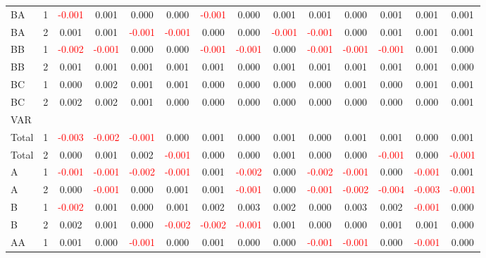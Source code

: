 \begin{table}[H]
{\begin{tabular}{llcccccccccccc}
BA & 1 & \textcolor{red}{-0.001} & 0.001 & 0.000 & 0.000 & \textcolor{red}{-0.001} & 0.000 & 0.001 & 0.001 & 0.000 & 0.001 & 0.001 & 0.001\\
BA & 2 & 0.001 & 0.001 & \textcolor{red}{-0.001} & \textcolor{red}{-0.001} & 0.000 & 0.000 & \textcolor{red}{-0.001} & \textcolor{red}{-0.001} & 0.000 & 0.001 & 0.001 & 0.001\\
BB & 1 & \textcolor{red}{-0.002} & \textcolor{red}{-0.001} & 0.000 & 0.000 & \textcolor{red}{-0.001} & \textcolor{red}{-0.001} & 0.000 & \textcolor{red}{-0.001} & \textcolor{red}{-0.001} & \textcolor{red}{-0.001} & 0.001 & 0.000\\
BB & 2 & 0.001 & 0.001 & 0.001 & 0.001 & 0.001 & 0.000 & 0.001 & 0.001 & 0.001 & 0.001 & 0.001 & 0.000\\
BC & 1 & 0.000 & 0.002 & 0.001 & 0.001 & 0.000 & 0.000 & 0.000 & 0.000 & 0.001 & 0.000 & 0.001 & 0.001\\
BC & 2 & 0.002 & 0.002 & 0.001 & 0.000 & 0.000 & 0.000 & 0.000 & 0.000 & 0.000 & 0.000 & 0.000 & 0.001\\
\hline
VAR &  &  &  &  &  &  &  &  &  &  &  &  & \\
\hline
Total & 1 & \textcolor{red}{-0.003} & \textcolor{red}{-0.002} & \textcolor{red}{-0.001} & 0.000 & 0.001 & 0.000 & 0.001 & 0.000 & 0.001 & 0.001 & 0.000 & 0.001\\
Total & 2 & 0.000 & 0.001 & 0.002 & \textcolor{red}{-0.001} & 0.000 & 0.000 & 0.001 & 0.000 & 0.000 & \textcolor{red}{-0.001} & 0.000 & \textcolor{red}{-0.001}\\
A & 1 & \textcolor{red}{-0.001} & \textcolor{red}{-0.001} & \textcolor{red}{-0.002} & \textcolor{red}{-0.001} & 0.001 & \textcolor{red}{-0.002} & 0.000 & \textcolor{red}{-0.002} & \textcolor{red}{-0.001} & 0.000 & \textcolor{red}{-0.001} & 0.001\\
A & 2 & 0.000 & \textcolor{red}{-0.001} & 0.000 & 0.001 & 0.001 & \textcolor{red}{-0.001} & 0.000 & \textcolor{red}{-0.001} & \textcolor{red}{-0.002} & \textcolor{red}{-0.004} & \textcolor{red}{-0.003} & \textcolor{red}{-0.001}\\
B & 1 & \textcolor{red}{-0.002} & 0.001 & 0.000 & 0.001 & 0.002 & 0.003 & 0.002 & 0.000 & 0.003 & 0.002 & \textcolor{red}{-0.001} & 0.000\\
B & 2 & 0.002 & 0.001 & 0.000 & \textcolor{red}{-0.002} & \textcolor{red}{-0.002} & \textcolor{red}{-0.001} & 0.001 & 0.000 & 0.000 & 0.001 & 0.001 & 0.000\\
AA & 1 & 0.001 & 0.000 & \textcolor{red}{-0.001} & 0.000 & 0.001 & 0.000 & 0.000 & \textcolor{red}{-0.001} & \textcolor{red}{-0.001} & 0.000 & \textcolor{red}{-0.001} & 0.000\\

\end{tabular}}
\end{table}

